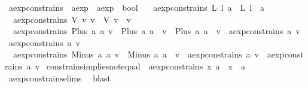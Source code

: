 \begin{isabellebody}
\endisatagproof
{\isafoldproof}%
%
\isadelimproof
\isanewline
%
\endisadelimproof
\isanewline
{}\isamarkupfalse%
\ aexp{\isacharunderscore}constrains\ {\isacharcolon}{\isacharcolon}\ {\isachardoublequoteopen}aexp\ {\isasymRightarrow}\ aexp\ {\isasymRightarrow}\ bool{\isachardoublequoteclose}\ \isanewline
\ \ {\isachardoublequoteopen}aexp{\isacharunderscore}constrains\ {\isacharparenleft}L\ l{\isacharparenright}\ a\ {\isacharequal}\ {\isacharparenleft}L\ l\ {\isacharequal}\ a{\isacharparenright}{\isachardoublequoteclose}\ {\isacharbar}\isanewline
\ \ {\isachardoublequoteopen}aexp{\isacharunderscore}constrains\ {\isacharparenleft}V\ v{\isacharparenright}\ v{\isacharprime}\ {\isacharequal}\ {\isacharparenleft}V\ v\ {\isacharequal}\ v{\isacharprime}{\isacharparenright}{\isachardoublequoteclose}\ {\isacharbar}\isanewline
\ \ {\isachardoublequoteopen}aexp{\isacharunderscore}constrains\ {\isacharparenleft}Plus\ a{}\ a{}{\isacharparenright}\ v\ {\isacharequal}\ {\isacharparenleft}{\isacharparenleft}Plus\ a{}\ a{}{\isacharparenright}\ {\isacharequal}\ v\ {\isasymor}\ {\isacharparenleft}Plus\ a{}\ a{}{\isacharparenright}\ {\isacharequal}\ v\ {\isasymor}\ {\isacharparenleft}aexp{\isacharunderscore}constrains\ a{}\ v\ {\isasymor}\ aexp{\isacharunderscore}constrains\ a{}\ v{\isacharparenright}{\isacharparenright}{\isachardoublequoteclose}\ {\isacharbar}\isanewline
\ \ {\isachardoublequoteopen}aexp{\isacharunderscore}constrains\ {\isacharparenleft}Minus\ a{}\ a{}{\isacharparenright}\ v\ {\isacharequal}\ {\isacharparenleft}{\isacharparenleft}Minus\ a{}\ a{}{\isacharparenright}\ {\isacharequal}\ v\ {\isasymor}\ {\isacharparenleft}aexp{\isacharunderscore}constrains\ a{}\ v\ {\isasymor}\ aexp{\isacharunderscore}constrains\ a{}\ v{\isacharparenright}{\isacharparenright}{\isachardoublequoteclose}\isanewline
\isanewline
{}\isamarkupfalse%
\ constrains{\isacharunderscore}implies{\isacharunderscore}not{\isacharunderscore}equal{\isacharcolon}\ {\isachardoublequoteopen}{\isasymnot}\ aexp{\isacharunderscore}constrains\ x\ a\ {\isasymLongrightarrow}\ x\ {\isasymnoteq}\ a{\isachardoublequoteclose}\isanewline
%
\isadelimproof
\ \ %
\endisadelimproof
%
\isatagproof
{}\isamarkupfalse%
\ aexp{\isacharunderscore}constrains{\isachardot}elims{\isacharparenleft}{}{\isacharparenright}\ \isamarkupfalse%
\ blast%
\endisatagproof
{\isafoldproof}%

\end{isabellebody}
